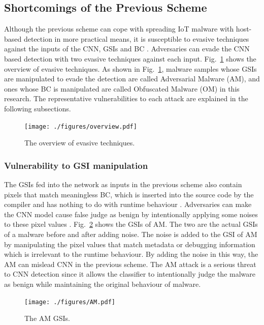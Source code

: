 \documentclass{ieeeaccess}
\newcommand{\myfigurename}{Fig.}
\begin{document}
\subsection{Shortcomings of the Previous Scheme}
Although the previous scheme can cope with spreading IoT malware with host-based detection in more practical means, it is susceptible to evasive techniques against the inputs of the CNN, GSIs and BC \cite{attack1, attack2}.
Adversaries can evade the CNN based detection with two evasive techniques against each input.
\myfigurename~\ref{fig:ov} shows the overview of evasive techniques.
As shown in \myfigurename~\ref{fig:ov}, malware samples whose GSIs are manipulated to evade the detection are called Adversarial Malware (AM), and ones whose BC is manipulated are called Obfuscated Malware (OM) in this research.
The representative vulnerabilities to each attack are explained in the following subsections.

\begin{figure}[t]
 \centering
 \texttt{[image: ./figures/overview.pdf]}
 \caption{The overview of evasive techniques.} 
 \label{fig:ov}
\end{figure}

\subsubsection{Vulnerability to GSI manipulation}
The GSIs fed into the network as inputs in the previous scheme also contain pixels that match meaningless BC, which is inserted into the source code by the compiler and has nothing to do with runtime behaviour \cite{am}.
Adversaries can make the CNN model cause false judge as benign by intentionally applying some noises to these pixel values \cite{am}.
\myfigurename~\ref{fig:amGSI} shows the GSIs of AM.
The two are the actual GSIs of a malware before and after adding noise.
The noise is added to the GSI of AM by manipulating the pixel values that match metadata or debugging information which is irrelevant to the runtime behaviour.
By adding the noise in this way, the AM can mislead CNN in the previous scheme.
The AM attack is a serious threat to CNN detection since it allows the classifier to intentionally judge the malware as benign while maintaining the original behaviour of malware.

\begin{figure}[t]
 \centering
 \texttt{[image: ./figures/AM.pdf]}
 \caption{The AM GSIs.} 
 \label{fig:amGSI}
\end{figure}
\end{document}
